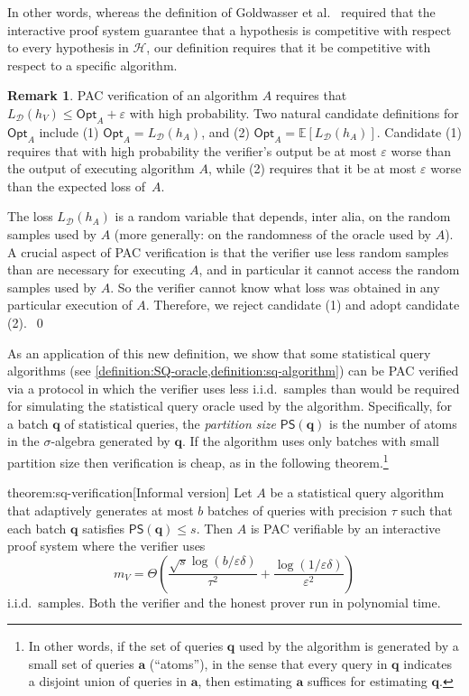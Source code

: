 \documentclass[11pt]{article}
\numberwithin{equation}{section}
\theoremstyle{definition}
\newtheorem{remark}[theorem]{Remark}
\theoremstyle{plain}
\theoremstyle{definition}\newtheorem{notation}[theorem]{Notation}\theoremstyle{plain}\raggedbottom
\newcommand{\roundBrackets}[1]{
	\mathopen{}\left(#1\right)\mathclose{}
}
\newcommand{\squareBrackets}[1]{
	\mathopen{}\left[#1\right]\mathclose{}
}
\newcommand{\customFunctionRound}[2]{
	#1\roundBrackets{#2}
}
\newcommand{\customFunctionSquare}[2]{
	#1\squareBrackets{#2}
}
\newcommand{\sfFunction}[2]{
	\customFunctionRound{\mathsf{#1}}{#2}
}
\newcommand{\bbFunction}[2]{
	\customFunctionSquare{\mathbb{#1}}{#2}
}
\newcommand{\ThetaOf}[1]{\Theta\roundBrackets{#1}}
\newcommand{\EE}[1]{\bbFunction{E}{#1}}
\newcommand{\Loss}[2]{\LossNameEmpty_{#1}\roundBrackets{#2}}
\newcommand{\LossNameEmpty}{L}
\newcommand{\Opt}{\mathsf{Opt}}
\newcommand{\cD}{\mathcal{D}}
\newcommand{\cH}{\mathcal{H}}
\newcommand{\ba}{\mathbf{a}}
\newcommand{\bq}{\mathbf{q}}
\newcommand{\1}{\mathds{1}}
\newcommand{\hA}{h_{\scriptscriptstyle A}}
\newcommand{\hV}{h_{\scriptscriptstyle V}}
\newcommand{\mV}{m_{\scriptscriptstyle V}}
\newcommand{\batchUpperBound}{b}
\newcommand{\psUpperBound}{s}
\newcommand{\partitionSize}[1]{\sfFunction{PS}{#1}}
\begin{document}
In other words, whereas the definition of Goldwasser et al.\ \cite{GoldwasserRSY21} required that the interactive proof system guarantee that a hypothesis is competitive with respect to every hypothesis in $\cH$, our definition requires that it be competitive with respect to a specific algorithm.  

\begin{remark}
	PAC verification of an algorithm $A$ requires that $\Loss{\cD}{\hV} \leq \Opt_A + \varepsilon$ with high probability. Two natural candidate definitions for $\Opt_A$ include (1) $\Opt_A = \Loss{\cD}{h_A}$, and (2) $\Opt_A = \EE{\Loss{\cD}{\hA}}$. Candidate (1) requires that with high probability the verifier's output be at most $\varepsilon$ worse than the output of executing algorithm $A$, while (2) requires that it be at most $\varepsilon$ worse than the expected loss of~$A$.

	The loss $\Loss{\cD}{h_A}$ is a random variable that depends, inter alia, on the random samples used by $A$ (more generally: on the randomness of the oracle used by $A$). A crucial aspect of PAC verification is that the verifier use less random samples than are necessary for executing $A$, and in particular it cannot access the random samples used by $A$. So the verifier cannot know what loss was obtained in any particular execution of $A$. Therefore, we reject candidate (1) and adopt candidate (2).~\qed
\end{remark}

As an application of this new definition, we show that some statistical query algorithms (see \cref{definition:SQ-oracle,definition:sq-algorithm}) can be PAC verified via a protocol in which the verifier uses less i.i.d.\ samples than would be required for simulating the statistical query oracle used by the algorithm. Specifically, for a batch $\bq$ of statistical queries, the \emph{partition size} $\partitionSize{\bq}$ is the number of atoms in the $\sigma$-algebra generated by $\bq$. If the algorithm uses only batches with small partition size then verification is cheap, as in the following theorem.\footnote{%
	In other words, if the set of queries $\bq$ used by the algorithm is generated by a small set of queries $\ba$ (``atoms''), in the sense that every query in $\bq$ indicates a disjoint union of queries in $\ba$, then estimating $\ba$ suffices for estimating $\bq$.
}

\begin{reptheorem}{theorem:sq-verification}[Informal version]
	Let $A$ be a statistical query algorithm that adaptively generates at most $b$ batches of queries with precision $\tau$ such that each batch $\bq$ satisfies $\partitionSize{\bq} \leq s$.	Then $A$ is PAC verifiable by an interactive proof system where the verifier uses
	\[
		\mV = \ThetaOf{\frac{\sqrt{\psUpperBound}\log(\batchUpperBound/\varepsilon\delta)}{\tau^2} + \frac{\log(1/\varepsilon\delta)}{\varepsilon^2}}
	\]
	i.i.d.\ samples. Both the verifier and the honest prover run in polynomial time.
\end{reptheorem}
\end{document}
